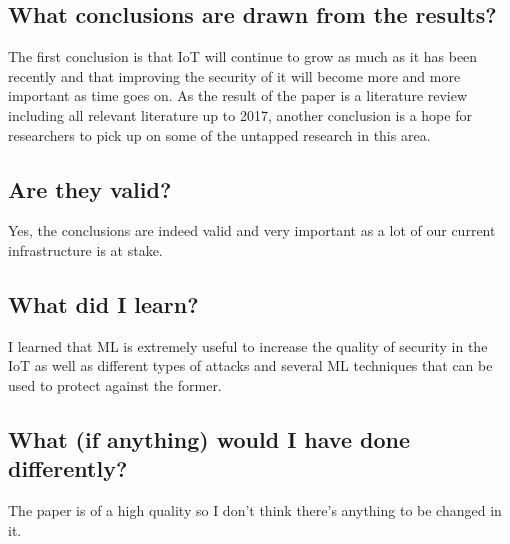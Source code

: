 \documentclass[11pt,a4paper]{article}
\begin{document}
\subsection*{What conclusions are drawn from the results?}
The first conclusion is that IoT will continue to grow as much as it has been recently and that improving the security of it will become more and more important as time goes on. As the result of the paper is a literature review including all relevant literature up to 2017, another conclusion is a hope for researchers to pick up on some of the untapped research in this area.

\subsection*{Are they valid?}
Yes, the conclusions are indeed valid and very important as a lot of our current infrastructure is at stake. 

\subsection*{What did I learn?}
I learned that ML is extremely useful to increase the quality of security in the IoT as well as different types of attacks and several ML techniques that can be used to protect against the former. 

\subsection*{What (if anything) would I have done differently?}
The paper is of a high quality so I don’t think there’s anything to be changed in it.
\end{document}

